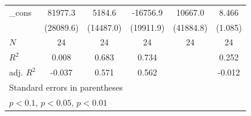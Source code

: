 \begin{table}[htbp]
\begin{tabular}{l*{5}{c}}
\addlinespace
\_cons      &     81977.3\sym{***}&      5184.6         &    -16756.9         &     10667.0         &       8.466\sym{***}\\
            &   (28089.6)         &   (14487.0)         &   (19911.9)         &   (41884.8)         &     (1.085)         \\
\midrule
\(N\)       &          24         &          24         &          24         &          24         &          24         \\
\(R^{2}\)   &       0.008         &       0.683         &       0.734         &                     &       0.252         \\
adj. \(R^{2}\)&      -0.037         &       0.571         &       0.562         &                     &      -0.012         \\
\bottomrule
\multicolumn{6}{l}{\footnotesize Standard errors in parentheses}\\
\multicolumn{6}{l}{\footnotesize \sym{*} \(p<0.1\), \sym{**} \(p<0.05\), \sym{***} \(p<0.01\)}\\
\end{tabular}
\end{table}
